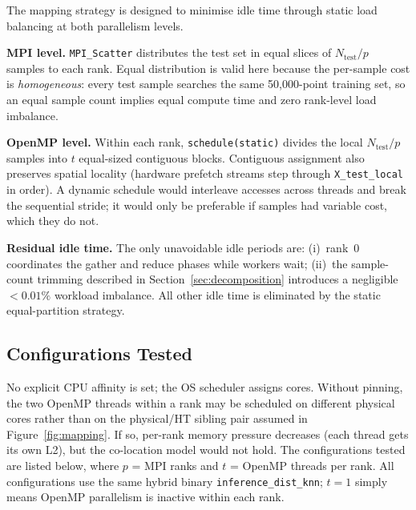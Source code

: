 \documentclass[12pt,a4paper]{article}
\begin{document}
The mapping strategy is designed to minimise idle time through static load
balancing at both parallelism levels.

\textbf{MPI level.}
\texttt{MPI\_Scatter} distributes the test set in equal slices of
$N_\text{test}/p$ samples to each rank. Equal distribution is valid here
because the per-sample cost is \emph{homogeneous}: every test sample searches
the same 50{,}000-point training set, so an equal sample count implies equal
compute time and zero rank-level load imbalance.

\textbf{OpenMP level.}
Within each rank, \texttt{schedule(static)} divides the local
$N_\text{test}/p$ samples into $t$ equal-sized contiguous blocks.
Contiguous assignment also preserves spatial locality (hardware prefetch
streams step through \texttt{X\_test\_local} in order). A dynamic schedule
would interleave accesses across threads and break the sequential stride;
it would only be preferable if samples had variable cost, which they do not.

\textbf{Residual idle time.}
The only unavoidable idle periods are: (i)~rank~0 coordinates the gather and
reduce phases while workers wait; (ii)~the sample-count trimming described in
Section~\ref{sec:decomposition} introduces a negligible $< 0.01\%$ workload
imbalance. All other idle time is eliminated by the static equal-partition
strategy.

\subsection{Configurations Tested}

No explicit CPU affinity is set; the OS scheduler assigns cores.
Without pinning, the two OpenMP threads within a rank may be scheduled on
different physical cores rather than on the physical/HT sibling pair assumed
in Figure~\ref{fig:mapping}. If so, per-rank memory pressure decreases
(each thread gets its own L2), but the co-location model would not hold.
The configurations tested are listed below, where $p$ = MPI ranks
and $t$ = OpenMP threads per rank. All configurations use the same
hybrid binary \texttt{inference\_dist\_knn}; $t=1$ simply means
OpenMP parallelism is inactive within each rank.
\end{document}
